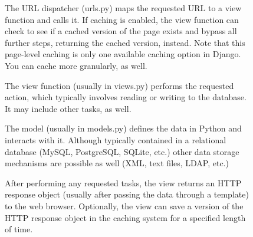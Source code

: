\begin{enumerate}
\begin{figure}
    \begin{minipage}{\linewidth}
        \centering
        \begin{minipage}{0.45\linewidth}
                \item The URL dispatcher (urls.py) maps the requested URL
                    to a view function and calls it. If caching is enabled,
                    the view function can check to see if a cached version
                    of the page exists and bypass all further steps,
                    returning the cached version, instead. Note that this
                    page-level caching is only one available caching option
                    in Django. You can cache more granularly, as well.
                \item The view function (usually in views.py) performs the
                    requested action, which typically involves reading or
                    writing to the database. It may include other tasks, as
                    well.
                \item The model (usually in models.py) defines the data in
                    Python and interacts with it. Although typically
                    contained in a relational database (MySQL, PostgreSQL,
                    SQLite, etc.) other data storage mechanisms are
                    possible as well (XML, text files, LDAP, etc.)
                \item After performing any requested tasks, the view
                    returns an HTTP response object (usually after passing
                    the data through a template) to the web browser.
                    Optionally, the view can save a version of the HTTP
                    response object in the caching system for a specified
                    length of time.
        \end{minipage}
        \begin{minipage}{0.05\linewidth}
            \vline
        \end{minipage}
        \begin{minipage}{0.45\linewidth}
            \begin{center}

\end{center}
\end{minipage}
\end{minipage}
\end{figure}
\end{enumerate}
